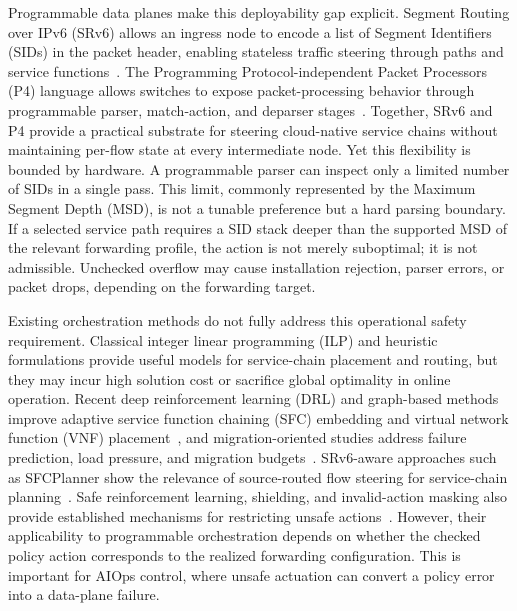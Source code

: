 \documentclass[final,5p]{elsarticle}
\newcommand{\rev}[1]{\textcolor{revisiongreen}{#1}}
\let\newrev\rev
\begin{document}
Programmable data planes make this deployability gap explicit. Segment Routing over IPv6 (SRv6) allows an ingress node to encode a list of Segment Identifiers (SIDs) in the packet header, enabling stateless traffic steering through paths and service functions~\cite{filsfils2015segment,rfc8986,rfc9352}. \newrev{The Programming Protocol-independent Packet Processors (P4) language allows switches to expose packet-processing behavior through programmable parser, match-action, and deparser stages~\cite{jeyakumar2014p4}.} Together, SRv6 and P4 provide a practical substrate for steering cloud-native service chains without maintaining per-flow state at every intermediate node. Yet this flexibility is bounded by hardware. A programmable parser can inspect only a limited number of SIDs in a single pass. This limit, commonly represented by the Maximum Segment Depth (MSD), is not a tunable preference but a hard parsing boundary. If a selected service path requires a SID stack deeper than the supported MSD of the relevant forwarding profile, the action is not merely suboptimal; it is not admissible. \rev{Unchecked overflow may cause installation rejection, parser errors, or packet drops, depending on the forwarding target.}

Existing orchestration methods do not fully address this operational safety requirement. Classical \rev{integer linear programming (ILP)} and heuristic formulations provide useful models for service-chain placement and routing, but they \rev{may incur high solution cost or sacrifice global optimality in online operation}. Recent \rev{deep reinforcement learning (DRL)} and graph-based methods improve adaptive \rev{service function chaining (SFC)} embedding and \rev{virtual network function (VNF)} placement~\cite{wang2021drl,xiao2023twostage,liu2024sfcml,taktak2024drl,wu2025drl}, and migration-oriented studies address failure prediction, load pressure, and migration budgets~\cite{zhai2023migration,addad2022ai,qin2023sfcmigrationbudget,afrasiabi2024cluster,zhang2025sfcmigration,hu2026rlpmo}. SRv6-aware approaches such as SFCPlanner show the relevance of source-routed flow steering for service-chain planning~\cite{qiu2024sfcplanner}. \rev{Safe reinforcement learning, shielding, and invalid-action masking also provide established mechanisms for restricting unsafe actions~\cite{gu2024safe,wachi2024constraint,huang2022closer}. However, their applicability to programmable orchestration depends on whether the checked policy action corresponds to the realized forwarding configuration.} This is \rev{important} for AIOps control, where unsafe actuation can convert a policy error into a data-plane failure.
\end{document}
